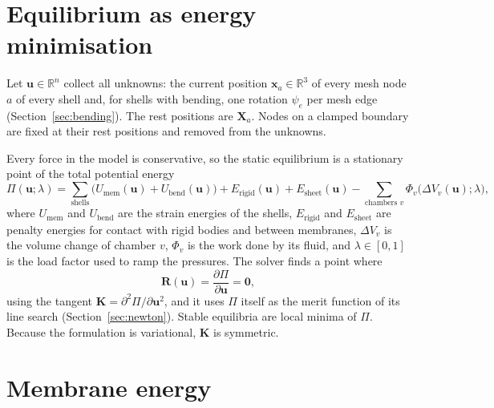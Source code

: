 \documentclass[11pt,a4paper]{article}
\newcommand{\vect}[1]{\bm{#1}}
\newcommand{\x}{\vect{x}}
\newcommand{\X}{\vect{X}}
\newcommand{\uu}{\vect{u}}
\newcommand{\R}{\vect{R}}
\newcommand{\K}{\mathbf{K}}
\newcommand{\dV}{\Delta V}
\theoremstyle{remark}
\begin{document}
\section{Equilibrium as energy minimisation}\label{sec:energy}

Let $\uu \in \mathbb{R}^{n}$ collect all unknowns: the current position $\x_a \in \mathbb{R}^3$ of
every mesh node $a$ of every shell and, for shells with bending, one rotation $\psi_e$ per mesh
edge (Section~\ref{sec:bending}). The rest positions are $\X_a$. Nodes on a clamped boundary are
fixed at their rest positions and removed from the unknowns.

Every force in the model is conservative, so the static equilibrium is a stationary point of the
total potential energy
\begin{equation}\label{eq:potential}
\Pi(\uu;\lambda) = \sum_{\text{shells}} \Big( U_{\text{mem}}(\uu) + U_{\text{bend}}(\uu) \Big)
  + E_{\text{rigid}}(\uu) + E_{\text{sheet}}(\uu)
  - \sum_{\text{chambers } v} \Phi_v\big(\dV_v(\uu);\lambda\big),
\end{equation}
where $U_{\text{mem}}$ and $U_{\text{bend}}$ are the strain energies of the shells,
$E_{\text{rigid}}$ and $E_{\text{sheet}}$ are penalty energies for contact with rigid bodies and
between membranes, $\dV_v$ is the volume change of chamber $v$, $\Phi_v$ is the work done by its
fluid, and $\lambda\in[0,1]$ is the load factor used to ramp the pressures. The solver finds a
point where
\begin{equation}
\R(\uu) = \frac{\partial \Pi}{\partial \uu} = \vect{0},
\end{equation}
using the tangent $\K = \partial^2\Pi/\partial\uu^2$, and it uses $\Pi$ itself as the merit
function of its line search (Section~\ref{sec:newton}). Stable equilibria are local minima of
$\Pi$. Because the formulation is variational, $\K$ is symmetric.

\section{Membrane energy}\label{sec:membrane}
\end{document}
